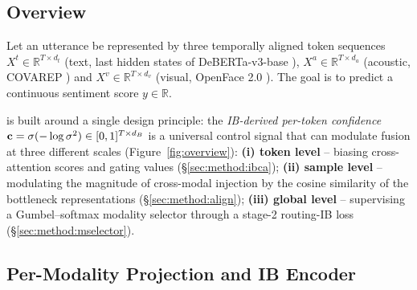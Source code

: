 \subsection{Overview}
\label{sec:method:overview}

Let an utterance be represented by three temporally aligned token sequences
$X^{t}\in\mathbb{R}^{T\times d_{t}}$ (text, last hidden states of
DeBERTa-v3-base \citep{he2023debertav3}),
$X^{a}\in\mathbb{R}^{T\times d_{a}}$ (acoustic, COVAREP
\citep{degottex2014covarep}) and
$X^{v}\in\mathbb{R}^{T\times d_{v}}$ (visual, OpenFace 2.0
\citep{baltrusaitis2018openface}).
The goal is to predict a continuous sentiment score $y\in\mathbb{R}$.

\methodname{} is built around a single design principle: the
\emph{IB-derived per-token confidence}
\(\mathbf{c}=\sigma(-\log\sigma^{2})\in[0,1]^{T\times d_{B}}\) is a universal
control signal that can modulate fusion at three different scales
(Figure~\ref{fig:overview}):
\textbf{(i) token level} -- biasing cross-attention scores and gating values
(\S\ref{sec:method:ibca});
\textbf{(ii) sample level} -- modulating the magnitude of cross-modal injection
by the cosine similarity of the bottleneck representations
(\S\ref{sec:method:align});
\textbf{(iii) global level} -- supervising a Gumbel--softmax modality selector
through a stage-2 routing-IB loss (\S\ref{sec:method:mselector}).



\subsection{Per-Modality Projection and IB Encoder}
\label{sec:method:ib}

